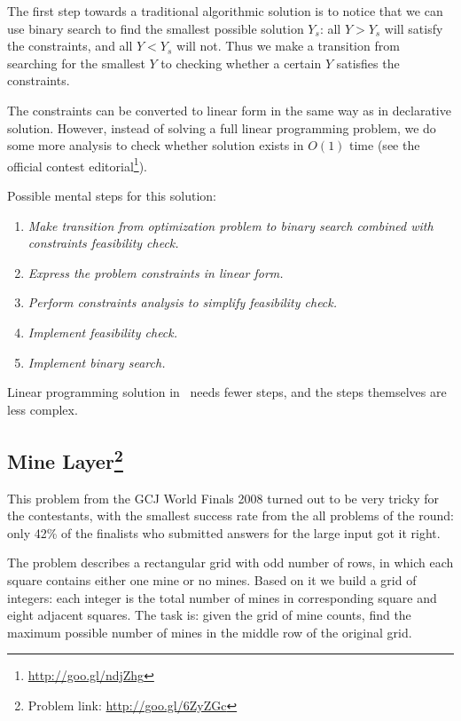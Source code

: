 \documentclass{acm_proc_article-sp}
\begin{document}
The first step towards a traditional algorithmic solution is to notice that we can use binary search to find the smallest possible solution $Y_s$: all $Y > Y_s$ will satisfy the constraints, and all $Y < Y_s$ will not. Thus we make a transition from searching for the smallest $Y$ to checking whether a certain $Y$ satisfies the constraints.

The constraints can be converted to linear form in the same way as in declarative solution. However, instead of solving a full linear programming problem, we do some more analysis to check whether solution exists in $O(1)$ time (see the official contest editorial\footnote{\url{http://goo.gl/ndjZhg}}). 

Possible mental steps for this solution:

\begin{enumerate}
\item \textit{Make transition from optimization problem to binary search combined with constraints feasibility check.}
\item \textit{Express the problem constraints in linear form.}
\item \textit{Perform constraints analysis to simplify feasibility check.}
\item \textit{Implement feasibility check.} 
\item \textit{Implement binary search.} 
\end{enumerate}

Linear programming solution in \eclipse\ needs fewer steps, and the steps themselves are less complex.

\subsection*{Mine Layer\footnote{Problem link: \url{http://goo.gl/6ZyZGc}}}

This problem from the GCJ World Finals 2008 turned out to be very tricky for the contestants, with the smallest success rate from the all problems of the round: 
only 42\% of the finalists who submitted answers for the large input got it right.

The problem describes a rectangular grid with odd number of rows, in which each square contains either one mine or no mines. 
Based on it we build a grid of integers: each integer is the total number of mines in corresponding square and eight adjacent squares. 
The task is: given the grid of mine counts, find the maximum possible number of mines in the middle row of the original grid.
\end{document}
